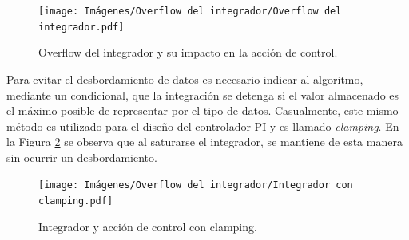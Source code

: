 \begin{figure}[hbt!]
    \centering
    \texttt{[image: Imágenes/Overflow del integrador/Overflow del integrador.pdf]}
    \caption{Overflow del integrador y su impacto en la acción de control.}
    \label{overflow}
\end{figure} 

Para evitar el desbordamiento de datos es necesario indicar al algoritmo, mediante un condicional, que la integración se detenga si el valor almacenado es el máximo posible de representar por el tipo de datos. Casualmente, este mismo método es utilizado para el diseño del controlador PI y es llamado \emph{clamping}. En la Figura \ref{clamping} se observa que al saturarse el integrador, se mantiene de esta manera sin ocurrir un desbordamiento.

\begin{figure}[hbt!]
    \centering
    \texttt{[image: Imágenes/Overflow del integrador/Integrador con clamping.pdf]}
    \caption{Integrador y acción de control con clamping.}
    \label{clamping}
\end{figure} 

\newpage